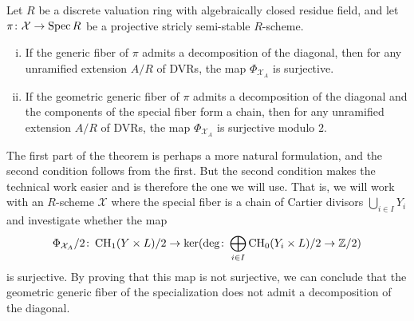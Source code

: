 \begin{theorem}
    \label{thm:BigPhiSurjective}
	Let $R$ be a discrete valuation ring with algebraically closed residue field, and let $\pi \colon \mathcal{X} \to \operatorname{Spec} R$ be a projective stricly semi-stable $R$-scheme.
	\begin{enumerate}[i)]
		\item If the generic fiber of $\pi$ admits a decomposition of the diagonal, then for any unramified extension $A/R$ of DVRs, the map $\Phi_{\mathcal{X}_A}$ is surjective.
		\item If the geometric generic fiber of $\pi$ admits a decomposition of the diagonal and the components of the special fiber form a chain, then for any unramified extension $A/R$ of DVRs, the map $\Phi_{\mathcal{X}_A}$ is surjective modulo $2$.
	\end{enumerate}
\end{theorem}
The first part of the theorem is perhaps a more natural formulation, and the second condition follows from the first. But the second condition makes the technical work easier and is therefore the one we will use. That is, we will work with an $R$-scheme $\mathcal{X}$ where the special fiber is a chain of Cartier divisors $\bigcup_{i \in I} Y_i$ and investigate whether the map 
\begin{equation}
	    \label{eq:BigPhiMapOverAReduced}
	    \Phi_{\mathcal{X}_A}/2 \colon \operatorname{CH}_1(Y \times L)/2 \to \ker(\deg \colon \bigoplus_{i \in I} \operatorname{CH}_0(Y_{i} \times L)/2 \to \mathbb{Z}/2)
\end{equation}
is surjective. By proving that this map is not surjective, we can conclude that the geometric generic fiber of the specialization does not admit a decomposition of the diagonal.


